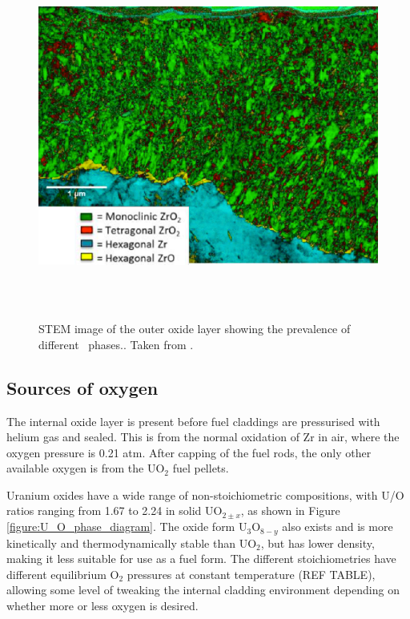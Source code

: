 \begin{figure}[htp]
\centering
\includegraphics[height=12cm]{images/outer_oxide.png}
\caption[STEM image of the outer oxide layer showing the prevalence of different \zirconia\ phases.]{STEM image of the outer oxide layer showing the prevalence of different \zirconia\ phases.. Taken from \cite{Hu2016}.}
\label{figure:outer_oxide}
\end{figure}


\subsection{Sources of oxygen}

The internal oxide layer is present before fuel claddings are pressurised with helium gas and sealed. This is from the normal oxidation of Zr in air, where the oxygen pressure is 0.21 atm. After capping of the fuel rods, the only other available oxygen is from the UO$_{2}$ fuel pellets.

Uranium oxides have a wide range of non-stoichiometric compositions, with U/O ratios ranging from 1.67 to 2.24 in solid UO$_{2 \pm x}$, as shown in Figure \ref{figure:U_O_phase_diagram}. The oxide form U$_{3}$O$_{8-y}$ also exists and is more kinetically and thermodynamically stable than UO$_{2}$, but has lower density, making it less suitable for use as a fuel form. The different stoichiometries have different equilibrium O$_{2}$ pressures at constant temperature (REF TABLE), allowing some level of tweaking the internal cladding environment depending on whether more or less oxygen is desired. 

